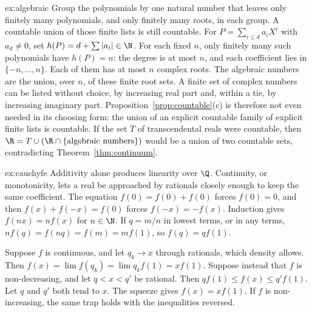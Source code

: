 \begin{solution}{ex:algebraic}
\idea Group the polynomials by one natural number that leaves only finitely many polynomials, and only finitely many roots, in each group. A countable union of those finite lists is still countable.
\writeup For $P=\sum_{i\le d}a_i X^i$ with $a_d\ne 0$, set $h(P)=d+\sum|a_i|\in\N$. For each fixed $n$, only finitely many such polynomials have $h(P)=n$: the degree is at most $n$, and each coefficient lies in $\{-n,\ldots,n\}$. Each of them has at most $n$ complex roots. The algebraic numbers are the union, over $n$, of these finite root sets. A finite set of complex numbers can be listed without choice, by increasing real part and, within a tie, by increasing imaginary part. Proposition~\ref{prop:countable}(c) is therefore not even needed in its choosing form: the union of an explicit countable family of explicit finite lists is countable. If the set $T$ of transcendental reals were countable, then $\R=T\cup(\R\cap\{\text{algebraic numbers}\})$ would be a union of two countable sets, contradicting Theorem~\ref{thm:continuum}.
\end{solution}

\begin{solution}{ex:cauchyfe}
\idea Additivity alone produces linearity over $\Q$. Continuity, or monotonicity, lets a real be approached by rationals closely enough to keep the same coefficient.
\writeup The equation $f(0)=f(0)+f(0)$ forces $f(0)=0$, and then $f(x)+f(-x)=f(0)$ forces $f(-x)=-f(x)$. Induction gives $f(nx)=nf(x)$ for $n\in\N$. If $q=m/n$ in lowest terms, or in any terms, $nf(q)=f(nq)=f(m)=mf(1)$, so $f(q)=qf(1)$.

Suppose $f$ is continuous, and let $q_k\to x$ through rationals, which density allows. Then $f(x)=\lim f(q_k)=\lim q_k f(1)=xf(1)$. Suppose instead that $f$ is non-decreasing, and let $q<x<q'$ be rational. Then $qf(1)\le f(x)\le q'f(1)$. Let $q$ and $q'$ both tend to $x$. The squeeze gives $f(x)=xf(1)$. If $f$ is non-increasing, the same trap holds with the inequalities reversed.
\end{solution}

